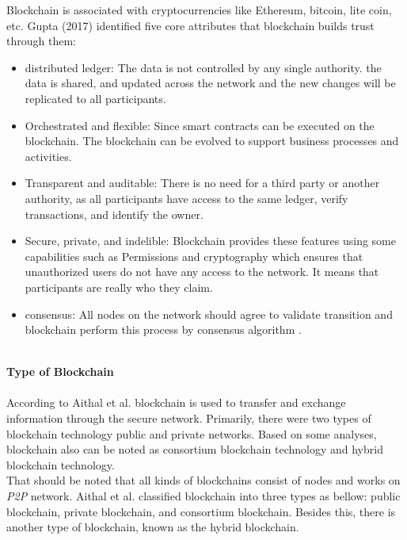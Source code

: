 Blockchain is associated with cryptocurrencies like Ethereum, bitcoin, lite coin, etc. Gupta (2017) \cite{Gupta} identified five core attributes that blockchain builds trust through them:
\begin{itemize}
    \item distributed ledger: The data is not controlled by any single authority. the data is shared, and updated across the network and the new changes will be replicated to all participants.
    \item Orchestrated and flexible: Since smart contracts can be executed on the blockchain. The blockchain can be evolved to support business processes and activities.
    \item Transparent and auditable: There is no need for a third party or another authority, as all participants have access to the same ledger, verify transactions, and identify the owner. 
    \item Secure, private, and indelible:
    Blockchain provides these features using some capabilities such as Permissions and cryptography which ensures that  
    unauthorized users do not have any access to the network. It means that participants are really who they claim.
    \item consensus: All nodes on the network should agree to validate transition and blockchain perform this process by consensus algorithm \cite{Gupta}.
\end{itemize}
\\
\textbf{Type of Blockchain} \\
\\
According to Aithal et al.\cite{Aithal} blockchain is used to transfer and exchange information through the secure network. Primarily, there were two types of blockchain technology public and private networks. Based on some analyses, blockchain also can be noted as consortium blockchain technology and hybrid blockchain technology. \\
That should be noted that all kinds of blockchains consist of nodes and works on \textit{P2P} network. Aithal et al.\cite{Aithal} classified blockchain into three types as bellow: public blockchain, private blockchain, and consortium blockchain. Besides this, there is another type of blockchain, known as the hybrid blockchain.
